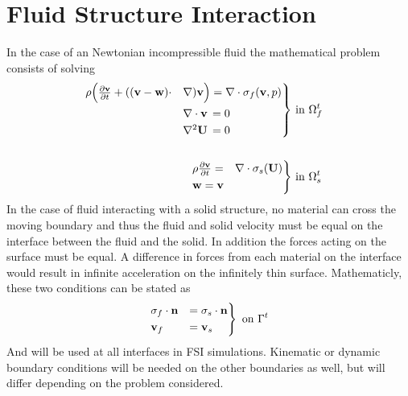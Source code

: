 \section{Fluid Structure Interaction}
In the case of an Newtonian incompressible fluid the mathematical problem consists of solving
\begin{align}
\begin{rcases}
\rho \Big{(} \frac{\partial \mathbf{v}}{\partial t} + ((\mathbf{v}-\mathbf{w})  \cdot & \nabla )  \mathbf{v} \Big{)}  =   \nabla \cdot \sigma_f(\mathbf{v},p)  \\
& \nabla \cdot \mathbf{v} \, = 0 \\
& \nabla ^2 \mathbf{U} \, = 0
\end{rcases}
& \text{ in } \Omega_f^t \\ \\
\begin{rcases}
\rho \frac{\partial \mathbf{v}}{\partial t}  = &  \nabla \cdot \sigma_s(\mathbf{U}) \\
\mathbf{w} =  \mathbf{v}
\end{rcases}& \text{ in } \Omega_s^t 
\end{align}
In the case of fluid interacting with a solid structure, no material can cross the moving boundary and thus the fluid and solid velocity must be equal on the interface between the fluid and the solid. In addition the forces acting on the surface must be equal. A difference in forces from each material on the interface would result in infinite acceleration on the infinitely thin surface. Mathematicly, these two conditions can be stated as
\begin{align}
\begin{rcases}
\sigma_f \cdot \mathbf{n} & =  \sigma_s \cdot \mathbf{n} \\
\mathbf{v}_f & = \mathbf{v}_s
\end{rcases}
\text{ on } \Gamma^t
\end{align}
And will be used at all interfaces in FSI simulations. Kinematic or dynamic boundary conditions will be needed on the other boundaries as well, but will differ depending on the problem considered. 


